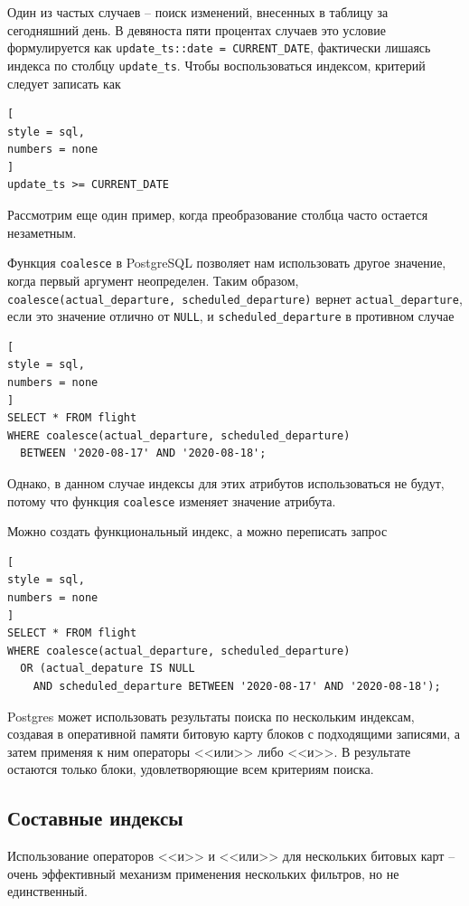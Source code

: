 \documentclass[%
	11pt,
	a4paper,
	utf8,
		]{article}
\begin{document}

Один из частых случаев -- поиск изменений, внесенных в таблицу за сегодняшний день. В девяноста пяти процентах случаев это условие формулируется как \verb|update_ts::date = CURRENT_DATE|, фактически лишаясь индекса по столбцу \verb|update_ts|. Чтобы воспользоваться индексом, критерий следует записать как 
\begin{lstlisting}[
style = sql,
numbers = none
]
update_ts >= CURRENT_DATE
\end{lstlisting}

Рассмотрим еще один пример, когда преобразование столбца часто остается незаметным.

Функция \verb|coalesce| в PostgreSQL позволяет нам использовать другое значение, когда первый аргумент неопределен. Таким образом, \verb|coalesce(actual_departure, scheduled_departure)| вернет \verb|actual_departure|, если это значение отлично от \verb|NULL|, и \verb|scheduled_departure| в противном случае
\begin{lstlisting}[
style = sql,
numbers = none
]
SELECT * FROM flight
WHERE coalesce(actual_departure, scheduled_departure)
  BETWEEN '2020-08-17' AND '2020-08-18';
\end{lstlisting}

Однако, в данном случае индексы для этих атрибутов использоваться не будут, потому что функция \verb|coalesce| изменяет значение атрибута.

Можно создать функциональный индекс, а можно переписать запрос
\begin{lstlisting}[
style = sql,
numbers = none
]
SELECT * FROM flight
WHERE coalesce(actual_departure, scheduled_departure)
  OR (actual_depature IS NULL
    AND scheduled_departure BETWEEN '2020-08-17' AND '2020-08-18');
\end{lstlisting}

Postgres может использовать результаты поиска по нескольким индексам, создавая в оперативной памяти битовую карту блоков с подходящими записями, а затем применяя к ним операторы <<или>> либо <<и>>. В результате остаются только блоки, удовлетворяющие всем критериям поиска. 

\subsection{Составные индексы}

Использование операторов <<и>> и <<или>> для нескольких битовых карт -- очень эффективный механизм применения нескольких фильтров, но не единственный.
\end{document}
